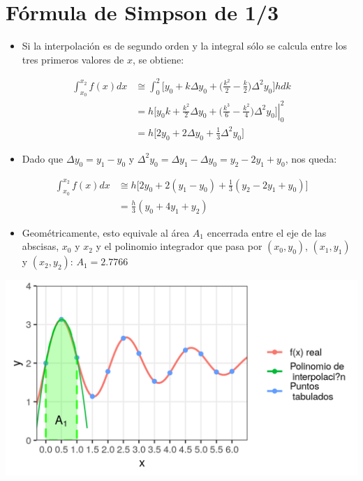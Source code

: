 \documentclass[openany]{book}
\providecommand{\tightlist}{%
  \setlength{\itemsep}{0pt}\setlength{\parskip}{0pt}}
\begin{document}
\hypertarget{fuxf3rmula-de-simpson-de-13}{%
\section{Fórmula de Simpson de 1/3}\label{fuxf3rmula-de-simpson-de-13}}

\begin{itemize}
\tightlist
\item
  Si la interpolación es de segundo orden y la integral sólo se calcula entre los tres primeros valores de \(x\), se obtiene:
\end{itemize}

\[
\begin{aligned}
\int_{x_0}^{x_2} f(x)dx &\cong  \int_{0}^{2} \Big[ y_0 + k \Delta y_0 + \Big( \frac{k^2}{2} - \frac{k}{2} \Big) \Delta^2 y_0 \Big]  hdk \\
&= h \left. \Big[ y_0 k + \frac{k^2}{2} \Delta y_0  + \Big( \frac{k^3}{6} - \frac{k^2}{4} \Big) \Delta^2 y_0 \Big] \right\vert_{0}^{2} \\
&= h \Big[ 2y_0 + 2 \Delta y_0  + \frac{1}{3} \Delta^2 y_0 \Big]
\end{aligned}
\]

\begin{itemize}
\tightlist
\item
  Dado que \(\Delta y_0 = y_1 - y_0\) y \(\Delta^2 y_0 = \Delta y_1 - \Delta y_0 = y_2 - 2y_1 + y_0\), nos queda:
\end{itemize}

\[
\begin{aligned}
\int_{x_0}^{x_2} f(x)dx &\cong h \Big[ 2y_0 + 2 (y_1 - y_0)  + \frac{1}{3} (y_2 - 2y_1 + y_0) \Big] \\
&= \frac{h}{3} (y_0 + 4y_1 + y_2)
\end{aligned}
\]

\begin{itemize}
\tightlist
\item
  Geométricamente, esto equivale al área \(A_1\) encerrada entre el eje de las abscisas, \(x_0\) y \(x_2\) y el polinomio integrador que pasa por \((x_0, y_0)\), \((x_1, y_1)\) y \((x_2, y_2)\): \hspace{3cm} \(A_1=2.7766\)
\end{itemize}

\begin{center}\includegraphics[width=0.95\linewidth]{Plots/U4/Unidad4_2_g5} \end{center}
\end{document}
